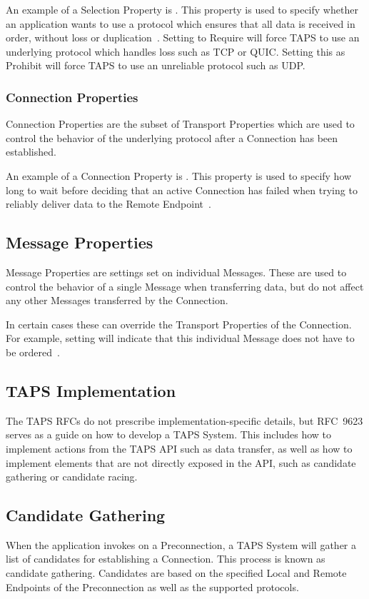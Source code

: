 An example of a Selection Property is .
This property is used to specify whether an application
wants to use a protocol which ensures that all data is received in order,
without loss or duplication~\cite[sec.~6.2.1]{rfc9621}. Setting 
to Require will force TAPS to use an underlying protocol
which handles loss such as TCP or QUIC. Setting this as
Prohibit will force TAPS to use an unreliable protocol
such as UDP.

\subsubsection{Connection Properties}
Connection Properties are the subset of Transport Properties which
are used to control the behavior of the underlying protocol after
a Connection has been established.

An example of a Connection Property is .
This property is used to specify how long to wait before deciding that an
active Connection has failed when trying to reliably deliver data to the
Remote Endpoint~\cite[sec.~8.1.3]{rfc9622}.

\subsection{Message Properties}
Message Properties are settings set on
individual Messages. These are used to control the behavior
of a single Message when transferring data, but do
not affect any other Messages transferred by the Connection.

In certain cases these can override the Transport Properties
of the Connection.
For example, setting  will
indicate that this individual Message does not have to be
ordered~\cite[sec.~9.1.3.4]{rfc9622}.

\subsection{TAPS Implementation}
The TAPS RFCs do not prescribe implementation-specific details,
but RFC~9623 serves as a guide on how to develop a TAPS System.
This includes how to implement actions from the TAPS API
such as data transfer, as well as how to implement elements that are not
directly exposed in the API, such as candidate gathering or candidate racing.

\subsection{Candidate Gathering}\label{sec:candidate-gathering}
When the application invokes  on a Preconnection,
a TAPS System will gather a list of candidates for establishing a
Connection. This process is known as candidate gathering.
Candidates are based on
the specified Local and Remote Endpoints of the Preconnection
as well as the supported protocols. 

